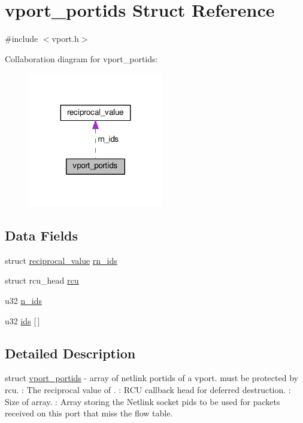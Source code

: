 \hypertarget{structvport__portids}{}\section{vport\+\_\+portids Struct Reference}
\label{structvport__portids}


{\ttfamily \#include $<$vport.\+h$>$}



Collaboration diagram for vport\+\_\+portids\+:
\nopagebreak
\begin{figure}[H]
\begin{center}
\leavevmode
\includegraphics[width=167pt]{structvport__portids__coll__graph}
\end{center}
\end{figure}
\subsection*{Data Fields}
\begin{DoxyCompactItemize}
\item 
struct \hyperlink{structreciprocal__value}{reciprocal\+\_\+value} \hyperlink{structvport__portids_a9828dc460e2dd5ef92f6c4a1eba6bc3b}{rn\+\_\+ids}
\item 
struct rcu\+\_\+head \hyperlink{structvport__portids_ab5cbafb043788d6b07ed054824f6167c}{rcu}
\item 
u32 \hyperlink{structvport__portids_ac76f512a0f0dbe3468b006e66bddc420}{n\+\_\+ids}
\item 
u32 \hyperlink{structvport__portids_aa8570053786f982366b3dfb513479628}{ids} \mbox{[}$\,$\mbox{]}
\end{DoxyCompactItemize}


\subsection{Detailed Description}
struct \hyperlink{structvport__portids}{vport\+\_\+portids} -\/ array of netlink portids of a vport. must be protected by rcu. \+: The reciprocal value of . \+: R\+C\+U callback head for deferred destruction. \+: Size of  array. \+: Array storing the Netlink socket pids to be used for packets received on this port that miss the flow table. 

